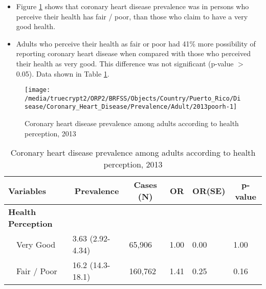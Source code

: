  \begin{itemize}

\item Figure \ref{fig:fairpoor.Coronary_Heart_Disease.2013} shows that coronary heart disease prevalence  was 
 in persons who perceive their health has fair / poor,
than those who claim to have a very good health.

\item Adults who perceive their health as fair or poor had 41\% more possibility of reporting coronary heart disease when compared with those who perceived their health as very good. This difference was not significant (p-value $>$ 0.05). Data shown in Table \ref{tab:fairpoor.Coronary_Heart_Disease.2013}.

\end{itemize}

\begin{figure}[H]
\caption{Coronary heart disease prevalence among adults according to health perception,
         2013}
\label{fig:fairpoor.Coronary_Heart_Disease.2013}

\begin{knitrout}
\color{fgcolor}

{\centering \texttt{[image: /media/truecrypt2/ORP2/BRFSS/Objects/Country/Puerto\_Rico/Disease/Coronary\_Heart\_Disease/Prevalence/Adult/2013poorh-1]} 

}



\end{knitrout}
 \end{figure}

\begin{table}[H]
\caption{Coronary heart disease prevalence  among adults according to health perception, 2013\label{tab:fairpoor.Coronary_Heart_Disease.2013}} 
\begin{center}
\begin{tabular}{llllll}
\hline\hline
\multicolumn{1}{l}{Variables}&\multicolumn{1}{c}{Prevalence}&\multicolumn{1}{c}{Cases (N)}&\multicolumn{1}{c}{OR}&\multicolumn{1}{c}{OR(SE)}&\multicolumn{1}{c}{p-value}\tabularnewline
\hline
{\bfseries Health Perception}&&&&&\tabularnewline
~~Very Good&3.63 (2.92-4.34)& 65,906&1.00&0.00&1.00\tabularnewline
~~Fair / Poor&16.2 (14.3-18.1)&160,762&1.41&0.25&0.16\tabularnewline
\hline
\end{tabular}\end{center}

\end{table}

